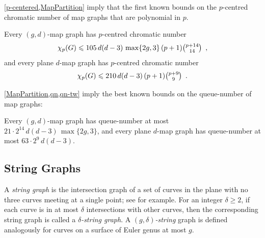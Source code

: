 \documentclass{patmorin}
\DeclareMathOperator{\qn}{qn}
\renewcommand{\le}{\leqslant}
\renewcommand{\geq}{\geqslant}
\begin{document}
\cref{p-centered,MapPartition} imply that the first known bounds on the $p$-centred chromatic number of map graphs that are polynomial in $p$.

\begin{cor}
Every $(g,d)$-map graph has $p$-centred chromatic number  
$$\chi_p(G)\le 105\, d(d-3)\, \max\{2g,3\}\, (p+1) \tbinom{p+14}{14}\enspace,$$
and every plane $d$-map graph has $p$-centred chromatic number  
$$\chi_p(G)\le 210\,d(d-3)\, (p+1) \tbinom{p+9}{9}\enspace.$$
\end{cor}

\cref{MapPartition,qn,qn-tw} imply the best known bounds on the queue-number of map graphs:

\begin{cor}
Every $(g,d)$-map graph has queue-number at most $ 21\cdot 2^{14} \, d(d-3)\, \max\{2g,3\} $, 
and every plane $d$-map graph  has queue-number at most 
$ 63 \cdot 2^9\, d(d-3)$. 
\end{cor}





\subsection{String Graphs}

A \emph{string graph} is the intersection graph of a set of curves in the plane with no three curves meeting at a single point; see  \cite{PachToth-DCG02,FP10,FP14} for example. For an integer $\delta\geq 2$, if each curve is in at most $\delta$ intersections with other curves, then the corresponding string graph is called a \emph{$\delta$-string graph}. A \emph{$(g,\delta)$-string} graph is defined analogously for curves on a surface of Euler genus at most $g$.  
\end{document}
